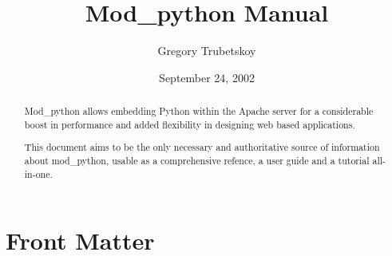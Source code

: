 \documentclass{manual}
\title{Mod\_python Manual}
\author{Gregory Trubetskoy}
\date{September 24, 2002}
\begin{document}
\maketitle

\ifhtml
\chapter*{Front Matter\label{front}}
\fi



\begin{abstract}

\noindent
Mod_python allows embedding Python within the Apache server for a considerable
boost in performance and added flexibility in designing web based
applications.

This document aims to be the only necessary and authoritative source of
information about mod_python, usable as a comprehensive refence, a user guide
and a tutorial all-in-one.

\begin{seealso}
\end{seealso}

\end{abstract}

\tableofcontents

\appendix


\end{document}
